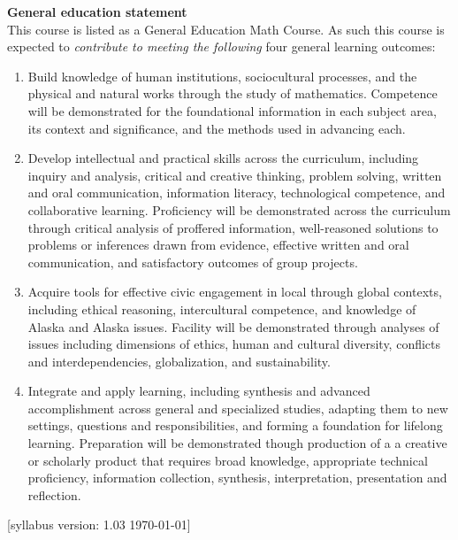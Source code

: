 \documentclass[12pt]{article}
\renewcommand{\emph}[1]{\textsf{\textbf{#1}}}
\newcommand{\localhead}[1]{\par\smallskip\textbf{#1} \smallskip\nobreak\\}%
\def\subheading#1{\localhead{\emph{#1}}}
\begin{document}
\strut

\vspace{-12pt}

\subheading{General education statement}
This course is listed as a General Education Math Course.  As such this course is expected to \textsl{contribute to meeting the following} four general learning outcomes:

\begin{enumerate}
\item Build knowledge of human institutions, sociocultural processes, and the physical and natural works through the study of mathematics.  Competence will be demonstrated for the foundational information in each subject area, its context and significance, and the methods used in advancing each.

\item Develop intellectual and practical skills across the curriculum, including inquiry and analysis, critical and creative thinking, problem solving, written and oral communication, information literacy, technological competence, and collaborative learning. Proficiency will be demonstrated across the curriculum through critical analysis of proffered information, well-reasoned solutions to problems or inferences drawn from evidence, effective written and oral communication, and satisfactory outcomes of group projects.

\item Acquire tools for effective civic engagement in local through global contexts, including ethical reasoning, intercultural competence, and knowledge of Alaska and Alaska issues.  Facility will be demonstrated through analyses of issues including dimensions of ethics, human and cultural diversity, conflicts and interdependencies, globalization, and sustainability.   

\item Integrate and apply learning, including synthesis and advanced accomplishment across general and specialized studies, adapting them to new settings, questions and responsibilities, and forming a foundation for lifelong learning. Preparation will be demonstrated though production of a a creative or scholarly product that requires broad knowledge, appropriate technical proficiency, information collection, synthesis, interpretation, presentation and reflection.
\end{enumerate}

\hfill  \scriptsize [syllabus version: 1.03 \today] \normalsize
\end{document}
